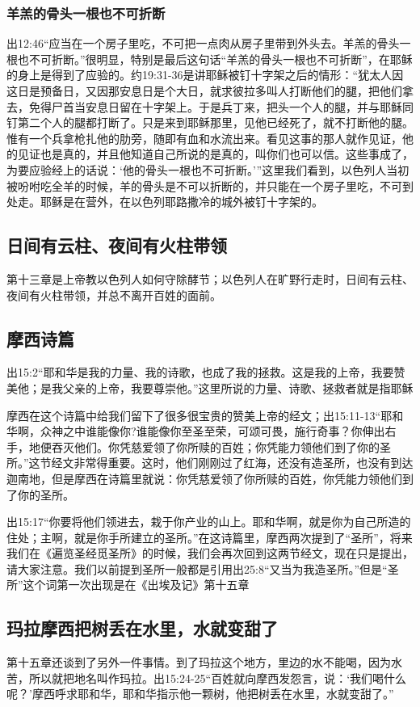 \subsubsection{羊羔的骨头一根也不可折断}
出12:46“应当在一个房子里吃，不可把一点肉从房子里带到外头去。羊羔的骨头一根也不可折断。”很明显，特别是最后这句话“羊羔的骨头一根也不可折断”，在耶稣的身上是得到了应验的。约19:31-36是讲耶稣被钉十字架之后的情形：“犹太人因这日是预备日，又因那安息日是个大日，就求彼拉多叫人打断他们的腿，把他们拿去，免得尸首当安息日留在十字架上。于是兵丁来，把头一个人的腿，并与耶稣同钉第二个人的腿都打断了。只是来到耶稣那里，见他已经死了，就不打断他的腿。惟有一个兵拿枪扎他的肋旁，随即有血和水流出来。看见这事的那人就作见证，他的见证也是真的，并且他知道自己所说的是真的，叫你们也可以信。这些事成了，为要应验经上的话说：‘他的骨头一根也不可折断。’”这里我们看到，以色列人当初被吩咐吃全羊的时候，羊的骨头是不可以折断的，并只能在一个房子里吃，不可到处走。耶稣是在营外，在以色列耶路撒冷的城外被钉十字架的。

\subsection{日间有云柱、夜间有火柱带领}

第十三章是上帝教以色列人如何守除酵节；以色列人在旷野行走时，日间有云柱、夜间有火柱带领，并总不离开百姓的面前。


\subsection{摩西诗篇}
出15:2“耶和华是我的力量、我的诗歌，也成了我的拯救。这是我的上帝，我要赞美他；是我父亲的上帝，我要尊崇他。”这里所说的力量、诗歌、拯救者就是指耶稣

摩西在这个诗篇中给我们留下了很多很宝贵的赞美上帝的经文；出15:11-13“耶和华啊，众神之中谁能像你?谁能像你至圣至荣，可颂可畏，施行奇事？你伸出右手，地便吞灭他们。你凭慈爱领了你所赎的百姓；你凭能力领他们到了你的圣所。”这节经文非常得重要。这时，他们刚刚过了红海，还没有造圣所，也没有到达迦南地，但是摩西在诗篇里就说：你凭慈爱领了你所赎的百姓，你凭能力领他们到了你的圣所。

出15:17“你要将他们领进去，栽于你产业的山上。耶和华啊，就是你为自己所造的住处；主啊，就是你手所建立的圣所。”在这诗篇里，摩西两次提到了“圣所”，将来我们在《遍览圣经觅圣所》的时候，我们会再次回到这两节经文，现在只是提出，请大家注意。我们以前提到圣所一般都是引用出25:8“又当为我造圣所。”但是“圣所”这个词第一次出现是在《出埃及记》第十五章

\subsection{玛拉摩西把树丢在水里，水就变甜了}
第十五章还谈到了另外一件事情。到了玛拉这个地方，里边的水不能喝，因为水苦，所以就把地名叫作玛拉。出15:24-25“百姓就向摩西发怨言，说：‘我们喝什么呢？’摩西呼求耶和华，耶和华指示他一颗树，他把树丢在水里，水就变甜了。”


